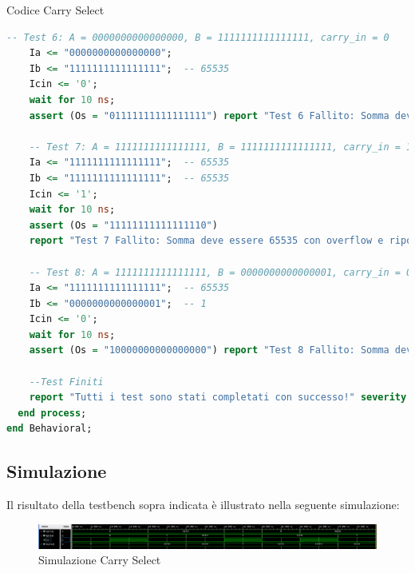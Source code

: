 \begin{problem}{Codice Carry Select}{}
\begin{lstlisting}[language=VHDL]
    -- Test 6: A = 0000000000000000, B = 1111111111111111, carry_in = 0
    Ia <= "0000000000000000"; 
    Ib <= "1111111111111111";  -- 65535
    Icin <= '0';
    wait for 10 ns;
    assert (Os = "01111111111111111") report "Test 6 Fallito: Somma deve essere 65535." severity error;

    -- Test 7: A = 1111111111111111, B = 1111111111111111, carry_in = 1
    Ia <= "1111111111111111";  -- 65535
    Ib <= "1111111111111111";  -- 65535
    Icin <= '1';
    wait for 10 ns;
    assert (Os = "11111111111111110") 
    report "Test 7 Fallito: Somma deve essere 65535 con overflow e riporto." severity error;

    -- Test 8: A = 1111111111111111, B = 0000000000000001, carry_in = 0
    Ia <= "1111111111111111";  -- 65535
    Ib <= "0000000000000001";  -- 1
    Icin <= '0';
    wait for 10 ns;
    assert (Os = "10000000000000000") report "Test 8 Fallito: Somma deve essere 0 (overflow)." severity error;

    --Test Finiti
    report "Tutti i test sono stati completati con successo!" severity note;
  end process;
end Behavioral;
\end{lstlisting}
\end{problem}
\subsection{Simulazione}
Il risultato della testbench sopra indicata è illustrato nella seguente simulazione:
\begin{figure}[h]
    \centering
    \includegraphics[width=16cm]{resources/carry_select_sim.png}
    \caption{Simulazione Carry Select}
    \label{fig:simulation_carryselect}
\end{figure}

